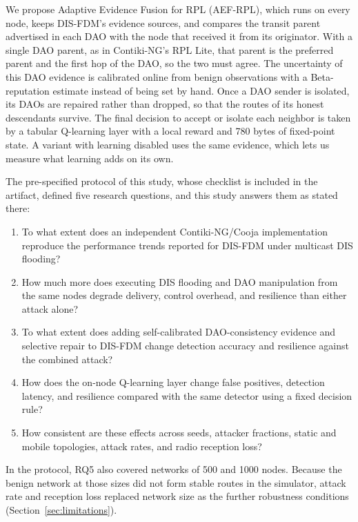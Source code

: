 We propose Adaptive Evidence Fusion for RPL (AEF-RPL), which runs on every node, keeps DIS-FDM's evidence sources, and compares the transit parent advertised in each DAO with the node that received it from its originator. With a single DAO parent, as in Contiki-NG's RPL Lite, that parent is the preferred parent and the first hop of the DAO, so the two must agree. The uncertainty of this DAO evidence is calibrated online from benign observations with a Beta-reputation estimate \cite{ganeriwal2008} instead of being set by hand. Once a DAO sender is isolated, its DAOs are repaired rather than dropped, so that the routes of its honest descendants survive. The final decision to accept or isolate each neighbor is taken by a tabular Q-learning layer \cite{watkins1992} with a local reward and 780 bytes of fixed-point state. A variant with learning disabled uses the same evidence, which lets us measure what learning adds on its own.

The pre-specified protocol of this study, whose checklist is included in the artifact, defined five research questions, and this study answers them as stated there:
\begin{enumerate}
\item[RQ1:] To what extent does an independent Contiki-NG/Cooja implementation reproduce the performance trends reported for DIS-FDM under multicast DIS flooding?
\item[RQ2:] How much more does executing DIS flooding and DAO manipulation from the same nodes degrade delivery, control overhead, and resilience than either attack alone?
\item[RQ3:] To what extent does adding self-calibrated DAO-consistency evidence and selective repair to DIS-FDM change detection accuracy and resilience against the combined attack?
\item[RQ4:] How does the on-node Q-learning layer change false positives, detection latency, and resilience compared with the same detector using a fixed decision rule?
\item[RQ5:] How consistent are these effects across seeds, attacker fractions, static and mobile topologies, attack rates, and radio reception loss?
\end{enumerate}
In the protocol, RQ5 also covered networks of 500 and 1000 nodes. Because the benign network at those sizes did not form stable routes in the simulator, attack rate and reception loss replaced network size as the further robustness conditions (Section~\ref{sec:limitations}).

